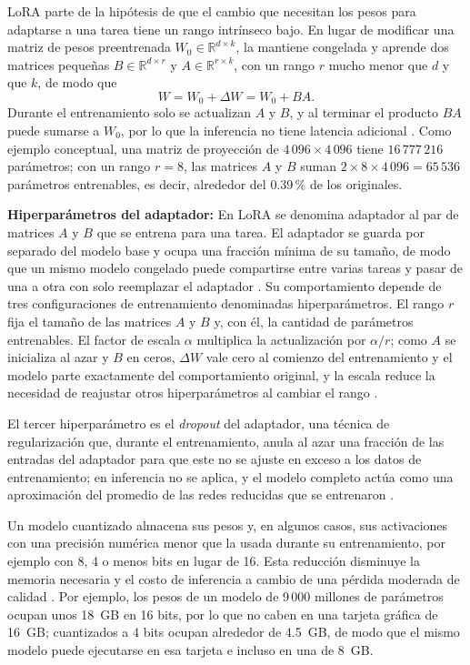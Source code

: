 
LoRA parte de la hipótesis de que el cambio que necesitan los pesos para adaptarse a una tarea tiene un rango intrínseco bajo. En lugar de modificar una matriz de pesos preentrenada $W_0 \in \mathbb{R}^{d \times k}$, la mantiene congelada y aprende dos matrices pequeñas $B \in \mathbb{R}^{d \times r}$ y $A \in \mathbb{R}^{r \times k}$, con un rango $r$ mucho menor que $d$ y que $k$, de modo que
\begin{equation}
W = W_0 + \Delta W = W_0 + BA.
\end{equation}
Durante el entrenamiento solo se actualizan $A$ y $B$, y al terminar el producto $BA$ puede sumarse a $W_0$, por lo que la inferencia no tiene latencia adicional \cite{hu2022_lora}. Como ejemplo conceptual, una matriz de proyección de $4\,096 \times 4\,096$ tiene $16\,777\,216$ parámetros; con un rango $r = 8$, las matrices $A$ y $B$ suman $2 \times 8 \times 4\,096 = 65\,536$ parámetros entrenables, es decir, alrededor del 0.39\,\% de los originales.

\textbf{Hiperparámetros del adaptador:} En LoRA se denomina adaptador al par de matrices $A$ y $B$ que se entrena para una tarea. El adaptador se guarda por separado del modelo base y ocupa una fracción mínima de su tamaño, de modo que un mismo modelo congelado puede compartirse entre varias tareas y pasar de una a otra con solo reemplazar el adaptador \cite{hu2022_lora}. Su comportamiento depende de tres configuraciones de entrenamiento denominadas hiperparámetros. El rango $r$ fija el tamaño de las matrices $A$ y $B$ y, con él, la cantidad de parámetros entrenables. El factor de escala $\alpha$ multiplica la actualización por $\alpha / r$; como $A$ se inicializa al azar y $B$ en ceros, $\Delta W$ vale cero al comienzo del entrenamiento y el modelo parte exactamente del comportamiento original, y la escala reduce la necesidad de reajustar otros hiperparámetros al cambiar el rango \cite{hu2022_lora}.

El tercer hiperparámetro es el \textit{dropout} del adaptador, una técnica de regularización que, durante el entrenamiento, anula al azar una fracción de las entradas del adaptador para que este no se ajuste en exceso a los datos de entrenamiento; en inferencia no se aplica, y el modelo completo actúa como una aproximación del promedio de las redes reducidas que se entrenaron \cite{srivastava2014_dropout}.

Un modelo cuantizado almacena sus pesos y, en algunos casos, sus activaciones con una precisión numérica menor que la usada durante su entrenamiento, por ejemplo con 8, 4 o menos bits en lugar de 16. Esta reducción disminuye la memoria necesaria y el costo de inferencia a cambio de una pérdida moderada de calidad \cite{wang2025_slm_survey}. Por ejemplo, los pesos de un modelo de 9\,000 millones de parámetros ocupan unos 18~GB en 16 bits, por lo que no caben en una tarjeta gráfica de 16~GB; cuantizados a 4 bits ocupan alrededor de 4.5~GB, de modo que el mismo modelo puede ejecutarse en esa tarjeta e incluso en una de 8~GB.

